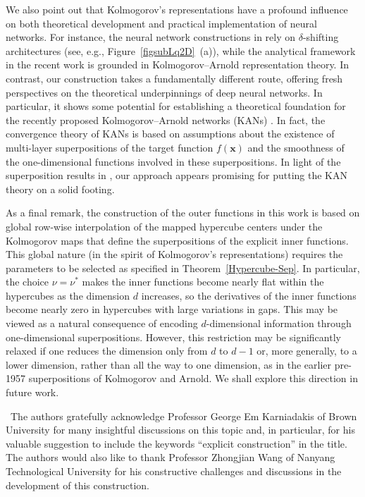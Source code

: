 \documentclass[10pt,reqno,final]{amsart}
\theoremstyle{remark}
\theoremstyle{definition}
\newcommand{\bs}[1]{\boldsymbol{#1}}
\newcommand{\wll}[1]{#1}
\begin{document}
 We also point out that Kolmogorov's representations have a profound influence on both theoretical development and practical implementation of neural networks.
 For instance, the neural network constructions in \cite{Shen2021three,Lu2021deep,Shen2022optimal} rely on $\delta$-shifting architectures (see,  e.g., Figure~\ref{figsubLq2D}~(a)), while the analytical framework in the recent work \cite{He2024} is grounded in Kolmogorov--Arnold representation theory. In contrast, our construction takes a fundamentally different route, offering fresh perspectives on the theoretical underpinnings of deep neural networks. In particular, it shows some potential for establishing a theoretical foundation for the recently proposed  Kolmogorov--Arnold networks (KANs)  \cite{Liu2024KAN}. In fact, the convergence theory of KANs is based on assumptions about the existence of multi-layer superpositions of the target function \(f(\bs x)\) and the smoothness of the one-dimensional functions involved in these superpositions. In light of the superposition results in \cite{Demko1977superposition,Doss1977superposition}, our approach appears promising for putting the KAN theory on a solid footing.

\wll{As a final remark, the construction of the outer functions in this work is based on global row-wise interpolation of the mapped hypercube centers under the Kolmogorov maps that define the superpositions of the explicit inner functions. This global nature (in the spirit of Kolmogorov's representations)  requires the parameters to be selected as specified in Theorem~\ref{Hypercube-Sep}. In particular, the choice $\nu=\nu^*$ makes the inner functions become nearly flat within the hypercubes as the dimension $d$ increases, so the derivatives of the inner functions become nearly zero in hypercubes with large variations in gaps.
This may be viewed as a natural consequence of encoding $d$-dimensional information through one-dimensional superpositions. However, this restriction may be significantly relaxed if one reduces the dimension only from $d$ to $d-1$ or, more generally, to a lower dimension, rather than all the way to one dimension, as in the earlier pre-1957 superpositions of Kolmogorov and Arnold. We shall explore this direction in future work. }      
    

\bigskip 
{}\, The authors gratefully acknowledge Professor George Em Karniadakis of Brown University for many insightful discussions on this topic and, in particular, for his valuable suggestion to include the keywords ``explicit construction'' in the title.  The authors would also like to thank Professor Zhongjian Wang of Nanyang Technological University for his constructive challenges and discussions in the development of this construction. 
\end{document}

